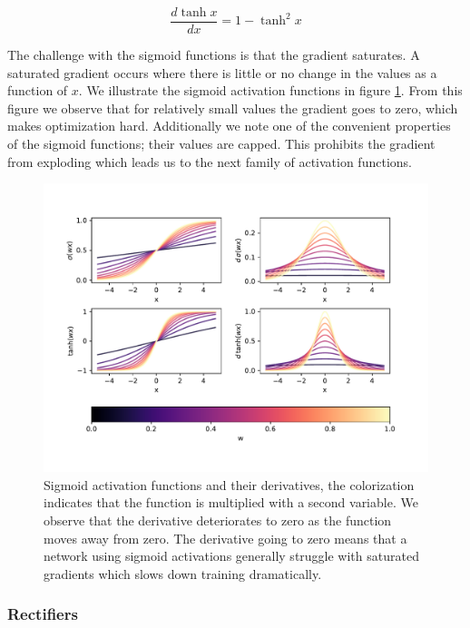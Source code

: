 \begin{equation}
\frac{d \tanh x}{d x}  = 1-\tanh^2 x
\end{equation}

\noindent The challenge with the sigmoid functions is that the gradient saturates. A saturated gradient occurs where there is little or no change in the values as a function of $x$. We illustrate the sigmoid activation functions in figure \ref{fig:sigmoid}. From this figure we observe that for relatively small values the gradient goes to zero, which makes optimization hard. Additionally we note one of the convenient properties of the sigmoid functions; their values are capped. This prohibits the gradient from exploding which leads us to the next family of activation functions.

\begin{figure}
\centering
\includegraphics[width=\textwidth]{../figures/activationssigmoids.pdf}
\caption[Sigmoid activation functions]{Sigmoid activation functions and their derivatives, the colorization indicates that the function is multiplied with a second variable. We observe that the derivative deteriorates to zero as the function moves away from zero. The derivative going to zero means that a network using sigmoid activations generally struggle with saturated gradients which slows down training dramatically.}\label{fig:sigmoid}
\end{figure}

\subsubsection{Rectifiers}

